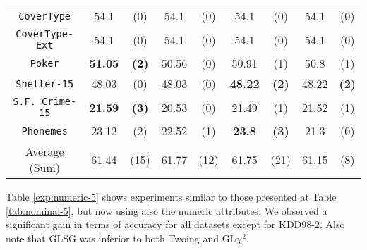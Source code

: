 \begin{table*}
\begin{tabular}{c|cc|cc|cc|cc}
{\tt CoverType}    &54.1        & (0)       & 54.1        & (0)       & 54.1        & (0)       & 54.1        & (0)       \\
{\tt CoverType-Ext}&54.1        & (0)       & 54.1        & (0)       & 54.1        & (0)       & 54.1        & (0)       \\
{\tt Poker}        &{\bf 51.05} & {\bf (2)} & 50.56       & (0)       & 50.91       & (1)       & 50.8        & (1)       \\  
{\tt Shelter-15}   & 48.03      & (0)       & 48.03       & (0)       & {\bf 48.22} & {\bf (2)} & 48.22       & {\bf (2)} \\   
{\tt S.F. Crime-15}&{\bf 21.59} & {\bf (3)} & 20.53       & (0)       & 21.49       & (1)       & 21.52       & (1)       \\ 
{\tt Phonemes}     & 23.12      & (2)       & 22.52       & (1)       & {\bf 23.8 } & {\bf (3)} & 21.3        & (0)       \\ 
\hline
Average (Sum)      & 61.44      & (15)      & 61.77       & (12)      & 61.75       & (21)      & 61.15       & (8)
       \end{tabular}
\end{table*}


Table \ref{exp:numeric-5} shows experiments  similar to those presented at Table \ref{tab:nominal-5}, but now
using also the numeric attributes. We observed a significant gain in terms of accuracy for all datasets except for KDD98-2. 
Also note that GLSG was inferior to both Twoing and GL$\chi^2$.

